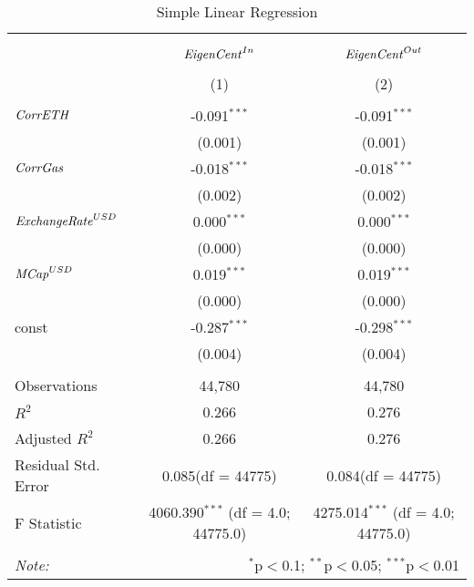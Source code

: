 \begin{table}[!htbp] \centering
  \caption{Simple Linear Regression}
\begin{tabular}{@{\extracolsep{5pt}}lcc}
\\[-1.8ex]\hline
\hline \\[-1.8ex]
\\[-1.8ex] & \multicolumn{1}{c}{${\it EigenCent}^{In}$} & \multicolumn{1}{c}{${\it EigenCent}^{Out}$}  \\
\\[-1.8ex] & (1) & (2) \\
\hline \\[-1.8ex]
 ${\it CorrETH}$ & -0.091$^{***}$ & -0.091$^{***}$ \\
  & (0.001) & (0.001) \\
 ${\it CorrGas}$ & -0.018$^{***}$ & -0.018$^{***}$ \\
  & (0.002) & (0.002) \\
 ${\it ExchangeRate}^{USD}$ & 0.000$^{***}$ & 0.000$^{***}$ \\
  & (0.000) & (0.000) \\
 ${\it MCap}^{USD}$ & 0.019$^{***}$ & 0.019$^{***}$ \\
  & (0.000) & (0.000) \\
 const & -0.287$^{***}$ & -0.298$^{***}$ \\
  & (0.004) & (0.004) \\
\hline \\[-1.8ex]
 Observations & 44,780 & 44,780 \\
 $R^2$ & 0.266 & 0.276 \\
 Adjusted $R^2$ & 0.266 & 0.276 \\
 Residual Std. Error & 0.085(df = 44775) & 0.084(df = 44775)  \\
 F Statistic & 4060.390$^{***}$ (df = 4.0; 44775.0) & 4275.014$^{***}$ (df = 4.0; 44775.0) \\
\hline
\hline \\[-1.8ex]
\textit{Note:} & \multicolumn{2}{r}{$^{*}$p$<$0.1; $^{**}$p$<$0.05; $^{***}$p$<$0.01} \\
\end{tabular}
\end{table}